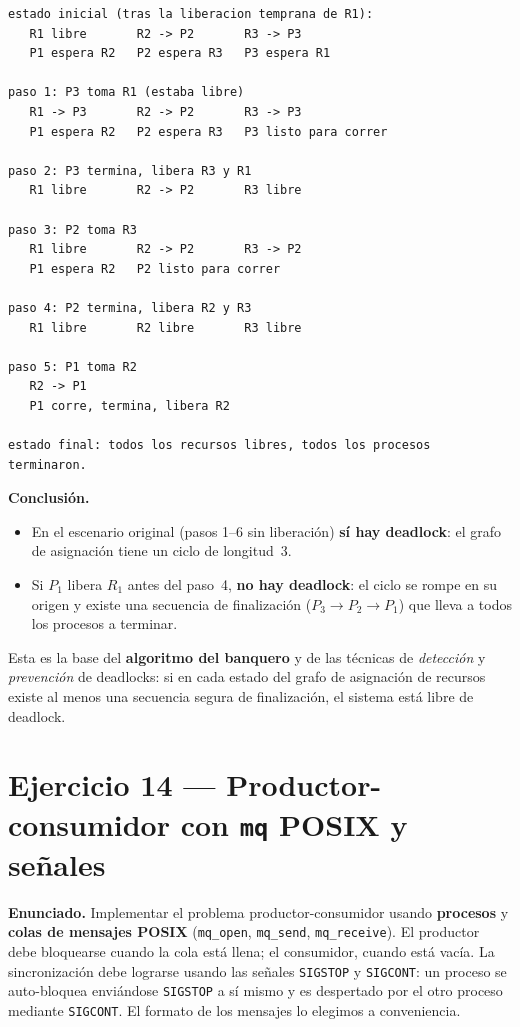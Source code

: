 \documentclass[11pt,a4paper]{article}
\begin{document}
\begin{lstlisting}[style=textstyle]
estado inicial (tras la liberacion temprana de R1):
   R1 libre       R2 -> P2       R3 -> P3
   P1 espera R2   P2 espera R3   P3 espera R1

paso 1: P3 toma R1 (estaba libre)
   R1 -> P3       R2 -> P2       R3 -> P3
   P1 espera R2   P2 espera R3   P3 listo para correr

paso 2: P3 termina, libera R3 y R1
   R1 libre       R2 -> P2       R3 libre

paso 3: P2 toma R3
   R1 libre       R2 -> P2       R3 -> P2
   P1 espera R2   P2 listo para correr

paso 4: P2 termina, libera R2 y R3
   R1 libre       R2 libre       R3 libre

paso 5: P1 toma R2
   R2 -> P1
   P1 corre, termina, libera R2

estado final: todos los recursos libres, todos los procesos terminaron.
\end{lstlisting}

\textbf{Conclusión.}

\begin{itemize}[leftmargin=*]
    \item En el escenario original (pasos 1--6 sin liberación) \textbf{sí
        hay deadlock}: el grafo de asignación tiene un ciclo de
        longitud~3.
    \item Si $P_1$ libera $R_1$ antes del paso~4, \textbf{no hay
        deadlock}: el ciclo se rompe en su origen y existe una
        secuencia de finalización ($P_3 \to P_2 \to P_1$) que lleva a
        todos los procesos a terminar.
\end{itemize}

Esta es la base del \textbf{algoritmo del banquero} y de las técnicas
de \emph{detección} y \emph{prevención} de deadlocks: si en cada
estado del grafo de asignación de recursos existe al menos una
secuencia segura de finalización, el sistema está libre de deadlock.

\section{Ejercicio 14 --- Productor-consumidor con \texttt{mq} POSIX y señales}

\textbf{Enunciado.} Implementar el problema productor-consumidor
usando \textbf{procesos} y \textbf{colas de mensajes POSIX}
(\texttt{mq\_open}, \texttt{mq\_send}, \texttt{mq\_receive}). El
productor debe bloquearse cuando la cola está llena; el consumidor,
cuando está vacía. La sincronización debe lograrse usando las señales
\texttt{SIGSTOP} y \texttt{SIGCONT}: un proceso se auto-bloquea
enviándose \texttt{SIGSTOP} a sí mismo y es despertado por el otro
proceso mediante \texttt{SIGCONT}. El formato de los mensajes lo
elegimos a conveniencia.
\end{document}
